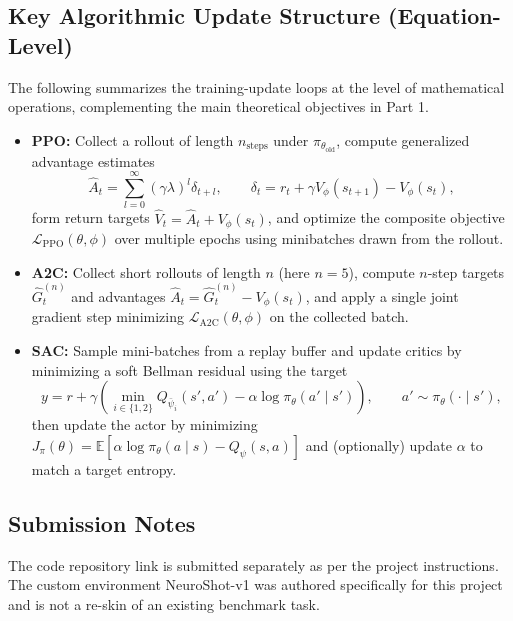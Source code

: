 \documentclass[a4paper,11pt,notitlepage]{report}
\begin{document}
\subsection{Key Algorithmic Update Structure (Equation-Level)}
The following summarizes the training-update loops at the level of mathematical operations, complementing the main theoretical objectives in Part 1.
\begin{itemize}
    \item \textbf{PPO:} Collect a rollout of length $n_{\mathrm{steps}}$ under $\pi_{\theta_{\mathrm{old}}}$, compute generalized advantage estimates
    \[
    \hat{A}_t=\sum_{l=0}^{\infty}(\gamma\lambda)^l\delta_{t+l},\qquad \delta_t=r_t+\gamma V_\phi(s_{t+1})-V_\phi(s_t),
    \]
    form return targets $\hat{V}_t=\hat{A}_t+V_\phi(s_t)$, and optimize the composite objective $\mathcal{L}_{\mathrm{PPO}}(\theta,\phi)$ over multiple epochs using minibatches drawn from the rollout.
    \item \textbf{A2C:} Collect short rollouts of length $n$ (here $n=5$), compute $n$-step targets $\hat{G}_t^{(n)}$ and advantages $\hat{A}_t=\hat{G}_t^{(n)}-V_\phi(s_t)$, and apply a single joint gradient step minimizing $\mathcal{L}_{\mathrm{A2C}}(\theta,\phi)$ on the collected batch.
    \item \textbf{SAC:} Sample mini-batches from a replay buffer and update critics by minimizing a soft Bellman residual using the target
    \[
    y=r+\gamma\left(\min_{i\in\{1,2\}}Q_{\bar{\psi}_i}(s',a')-\alpha\log\pi_\theta(a'\mid s')\right),\qquad a'\sim \pi_\theta(\cdot\mid s'),
    \]
    then update the actor by minimizing $J_\pi(\theta)=\mathbb{E}[\alpha\log\pi_\theta(a\mid s)-Q_\psi(s,a)]$ and (optionally) update $\alpha$ to match a target entropy.
\end{itemize}

\subsection{Submission Notes}
The code repository link is submitted separately as per the project instructions. The custom environment NeuroShot-v1 was authored specifically for this project and is not a re-skin of an existing benchmark task.
\end{document}
